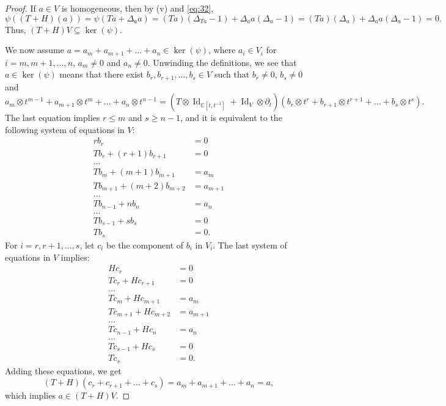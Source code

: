 \documentclass[a4paper, 12pt, reqno]{amsart}
\theoremstyle{remark}
\DeclareMathOperator{\Id}{Id}
\begin{document}
\begin{proof}
  If $a \in V$ is homogeneous, then by (v) and \eqref{eq:32},
  \begin{equation*}
    \psi((T + H)(a)) = \psi(Ta + \Delta_aa) = (Ta)(\Delta_{Ta} - 1) + \Delta_aa(\Delta_a - 1) = (Ta)(\Delta_a) + \Delta_aa(\Delta_a - 1) = 0.
  \end{equation*}
  Thus, $(T + H)V \subseteq \ker(\psi)$.

  We now assume $a = a_m + a_{m + 1} + \dots + a_n \in \ker(\psi)$, where $a_i \in V_i$ for $i = m, m + 1, \dots, n$, $a_m \neq 0$ and $a_n \neq 0$.
  Unwinding the definitions, we see that $a \in \ker(\psi)$ means that there exist $b_r, b_{r + 1}, \dots, b_s \in V$ such that $b_r \neq 0$, $b_s \neq 0$ and
  \begin{equation*}
    a_m\otimes t^{m - 1} + a_{m + 1}\otimes t^m + \dots + a_n\otimes t^{n - 1} = (T\otimes\Id_{\mathbb{C}[t, t^{-1}]} + \Id_V\otimes\partial_t)(b_r\otimes t^r + b_{r + 1}\otimes t^{r + 1} + \dots + b_s\otimes t^s).
  \end{equation*}
  The last equation implies $r \le m$ and $s \ge n - 1$, and it is equivalent to the following system of equations in $V$:
  \begin{align*}
    rb_r &= 0 \\
    Tb_r + (r + 1)b_{r + 1} &= 0 \\
    \dots \\
    Tb_m + (m + 1)b_{m + 1} &= a_m \\
    Tb_{m + 1} + (m + 2)b_{m + 2} &= a_{m + 1} \\
    \dots \\
    Tb_{n - 1} + nb_n &= a_n \\
    \dots \\
    Tb_{s - 1} + sb_s &= 0 \\
    Tb_s &= 0.
  \end{align*}
  For $i = r, r + 1, \dots, s$, let $c_i$ be the component of $b_i$ in $V_i$.
  The last system of equations in $V$ implies:
  \begin{align*}
    Hc_r &= 0 \\
    Tc_r + Hc_{r + 1} &= 0 \\
    \dots \\
    Tc_m + Hc_{m + 1} &= a_m \\
    Tc_{m + 1} + Hc_{m + 2} &= a_{m + 1} \\
    \dots \\
    Tc_{n - 1} + Hc_n &= a_n \\
    \dots \\
    Tc_{s - 1} + Hc_s &= 0 \\
    Tc_s &= 0.
  \end{align*}
  Adding these equations, we get
  \begin{equation*}
    (T + H)(c_r + c_{r + 1} + \dots + c_s) = a_m + a_{m + 1} + \dots + a_n = a,
  \end{equation*}
  which implies $a \in (T + H)V$.
\end{proof}
\end{document}
